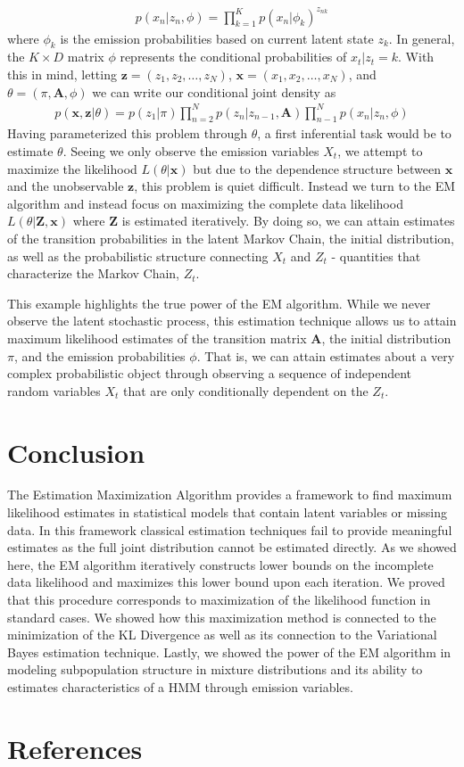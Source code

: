 \documentclass{article}
\begin{document}
\begin{align*}
p(x_n|z_n,\phi) = \prod_{k=1}^Kp(x_n|\phi_k)^{z_{nk}}
\end{align*}
where $\phi_{k}$ is the emission probabilities based on current latent state $z_k$. In general, the $K\times D$ matrix $\phi$ represents the conditional probabilities of $x_t|z_t = k$. With this in mind, letting $\mathbf{z} = (z_1, z_2, \ldots, z_N)$, $\mathbf{x} = (x_1, x_2, \ldots, x_N)$, and $\theta = (\pi, \mathbf{A}, \phi)$ we can write our conditional joint density as 
\begin{align*}
p(\mathbf{x},\mathbf{z}|\theta) = p(z_1|\pi)\prod_{n=2}^N p(z_n|z_{n-1},\mathbf{A})\prod_{n-1}^N p(x_n|z_n,\phi)
\end{align*}
Having parameterized this problem through $\theta$, a first inferential task would be to estimate $\theta$. Seeing we only observe the emission variables $X_t$, we attempt to maximize the likelihood $L(\theta|\mathbf{x})$ but due to the dependence structure between $\mathbf{x}$ and the unobservable $\mathbf{z}$, this problem is quiet difficult. Instead we turn to the EM algorithm and instead focus on maximizing the complete data likelihood $L(\theta|\mathbf{Z},\mathbf{x})$ where $\mathbf{Z}$ is estimated iteratively. By doing so, we can attain estimates of the transition probabilities in the latent Markov Chain, the initial distribution, as well as the probabilistic structure connecting $X_t$ and $Z_t$ - quantities that characterize the Markov Chain, $Z_t$. 

This example highlights the true power of the EM algorithm. While we never observe the latent stochastic process, this estimation technique allows us to attain maximum likelihood estimates of the transition matrix $\mathbf{A}$, the initial distribution $\pi$, and the emission probabilities $\phi$. That is, we can attain estimates about a very complex probabilistic object through observing a sequence of independent random variables $X_t$ that are only conditionally dependent on the $Z_t$.  

\section{Conclusion}
The Estimation Maximization Algorithm provides a framework to find maximum likelihood estimates in statistical models that contain latent variables or missing data. In this framework classical estimation techniques fail to provide meaningful estimates as the full joint distribution cannot be estimated directly. As we showed here, the EM algorithm iteratively constructs lower bounds on the incomplete data likelihood and maximizes this lower bound upon each iteration. We proved that this procedure corresponds to maximization of the likelihood function in standard cases. We showed how this maximization method is connected to the minimization of the KL Divergence as well as its connection to the Variational Bayes estimation technique. Lastly, we showed the power of the EM algorithm in modeling subpopulation structure in mixture distributions and its ability to estimates characteristics of a HMM through emission variables. 
\section{References}

\nocite{*}
\printbibliography[heading=none]
\end{document}
